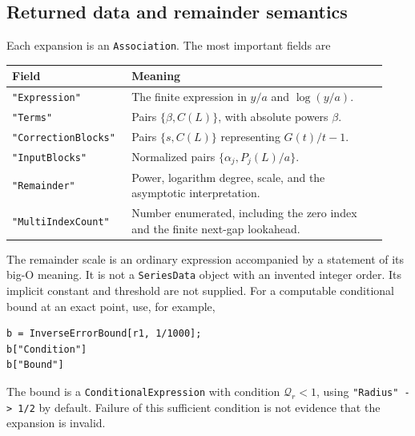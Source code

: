 \documentclass[11pt,a4paper]{article}
\theoremstyle{definition}
\begin{document}
\subsection{Returned data and remainder semantics}
Each expansion is an \texttt{Association}. The most important fields are
\begin{center}
\begin{tabular}{@{}p{0.28\linewidth}p{0.65\linewidth}@{}}
\toprule
Field & Meaning\\\midrule
\texttt{"Expression"} & The finite expression in \(y/a\) and \(\log(y/a)\).\\
\texttt{"Terms"} & Pairs \(\{\beta,C(L)\}\), with absolute powers \(\beta\).\\
\texttt{"CorrectionBlocks"} & Pairs \(\{s,C(L)\}\) representing \(G(t)/t-1\).\\
\texttt{"InputBlocks"} & Normalized pairs \(\{\alpha_j,P_j(L)/a\}\).\\
\texttt{"Remainder"} & Power, logarithm degree, scale, and the asymptotic interpretation.\\
\texttt{"MultiIndexCount"} & Number enumerated, including the zero index and the finite next-gap lookahead.\\
\bottomrule
\end{tabular}
\end{center}
The remainder scale is an ordinary expression accompanied by a statement of
its big-O meaning. It is not a \texttt{SeriesData} object with an invented
integer order. Its implicit constant and threshold are not supplied.
For a computable conditional bound at an exact point, use, for example,
\begin{lstlisting}
b = InverseErrorBound[r1, 1/1000];
b["Condition"]
b["Bound"]
\end{lstlisting}
The bound is a \texttt{ConditionalExpression} with condition
\(\mathcal Q_r<1\), using \texttt{"Radius" -> 1/2} by default. Failure of
this sufficient condition is not evidence that the expansion is invalid.
\end{document}
